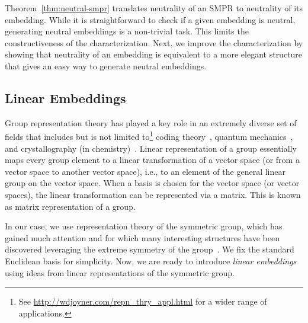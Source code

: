\documentclass[prodmode,acmec]{ec-acmsmall}
\begin{document}
Theorem~\ref{thm:neutral-smpr} translates neutrality of an SMPR to neutrality of its embedding. While it is straightforward to check if a given embedding is neutral, generating neutral embeddings is a non-trivial task. This limits the constructiveness of the characterization. Next, we improve the characterization by showing that neutrality of an embedding is equivalent to a more elegant structure that gives an easy way to generate neutral embeddings. 

\subsection{Linear Embeddings}
\label{sec:linear}

Group representation theory has played a key role in an extremely diverse set of fields that includes but is not limited to\footnote{See \url{http://wdjoyner.com/repn_thry_appl.html} for a wider range of applications.} coding theory~\cite{MS77}, quantum mechanics~\cite{BR86}, and crystallography (in chemistry)~\cite{KHS93}. Linear representation of a group essentially maps every group element to a linear transformation of a vector space (or from a vector space to another vector space), i.e., to an element of the general linear group on the vector space. When a basis is chosen for the vector space (or vector spaces), the linear transformation can be represented via a matrix. This is known as matrix representation of a group. 

In our case, we use representation theory of the symmetric group, which has gained much attention and for which many interesting structures have been discovered leveraging the extreme symmetry of the group~\cite{JKCR84}. We fix the standard Euclidean basis for simplicity. Now, we are ready to introduce \emph{linear embeddings} using ideas from linear representations of the symmetric group. 

\end{document}

